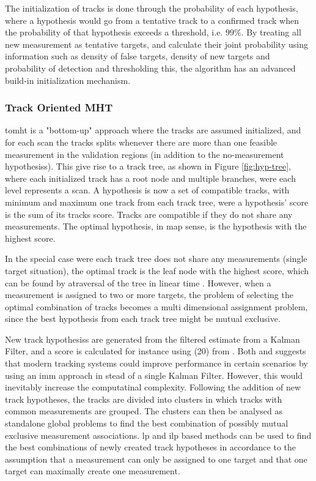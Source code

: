 The initialization of tracks is done through the probability of each hypothesis, where a hypothesis would go from a tentative track to a confirmed track when the probability of that hypothesis exceeds a threshold, i.e. $99 \%$. By treating all new \gls{measurement} as tentative \glspl{target}, and calculate their joint probability using information such as density of false \glspl{target}, density of new \glspl{target} and probability of detection and thresholding this, the algorithm has an advanced build-in initialization mechanism.

\subsubsection{Track Oriented MHT}
\label{subsec:tomht}
\gls{tomht} is a "bottom-up" approach where the tracks are assumed initialized, and for each scan the tracks splits whenever there are more than one feasible \gls{measurement} in the validation regions (in addition to the \glspl{no-measurement hypothesis}). This give rise to a track tree, as shown in Figure \ref{fig:hyp-tree}, where each initialized track has a root node and multiple branches, were each level represents a scan. A hypothesis is now a set of compatible tracks, with minimum and maximum one track from each track tree, were a hypothesis' \gls{score} is the sum of its \glspl{track} \gls{score}. Tracks are compatible if they do not share any \glspl{measurement}. The optimal hypothesis, in \gls{map} sense, is the hypothesis with the highest \gls{score}.

In the special case were each track tree does not share any \glspl{measurement} (single \gls{target} situation), the optimal track is the leaf node with the highest \gls{score}, which can be found by atraversal of the tree in linear time \cite{Tarjan1971}. However, when a \gls{measurement} is assigned to two or more \glspl{target}, the problem of selecting the optimal combination of tracks becomes a multi dimensional assignment problem, since the best hypothesis from each track tree might be mutual exclusive.

New \glspl{track hypothesis} are generated from the filtered estimate from a Kalman Filter, and a \gls{score} is calculated for instance using (20) from \cite{Bar-Shalom2007}. Both \cite{Bar-Shalom2007} and  \cite{Blackman2004} suggests that modern tracking systems could improve performance in certain scenarios by using an \gls{imm} approach in stead of a single Kalman Filter. However, this would inevitably increase the computatinal complexity. Following the addition of new track hypotheses, the tracks are divided into clusters in which tracks with common \glspl{measurement} are grouped. The clusters can then be analysed as standalone global problems to find the best combination of possibly mutual exclusive \gls{measurement} associations. \gls{lp} and \gls{ilp} based methods can be used to find the best combinations of newly created track hypotheses in accordance to the assumption that a \gls{measurement} can only be assigned to one \gls{target} and that one \gls{target} can maximally create one \gls{measurement}.

